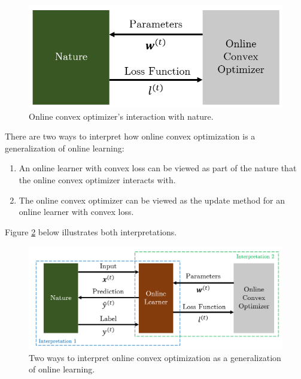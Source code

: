 \documentclass[11pt]{article}
\begin{document}
\begin{figure}[h]
\includegraphics[scale=0.5]{imgs/convex_optim.png}
\centering
\caption{Online convex optimizer's interaction with nature.}
\label{fig:convex_optim}
\end{figure}
There are two ways to interpret how online convex optimization is a 
generalization of online learning:
\begin{enumerate}
    \item An online learner with convex loss can be viewed as part of the nature that the online convex optimizer interacts with.
    \item The online convex optimizer can be viewed as the update method for an online learner with convex loss.
\end{enumerate}
Figure \ref{fig:oco} below illustrates both interpretations.
\begin{figure}[h]
\includegraphics[scale=0.5]{imgs/oco_ol.png}
\centering
\caption{Two ways to interpret online convex optimization as a generalization of online learning.}
\label{fig:oco}
\end{figure}
\end{document}
